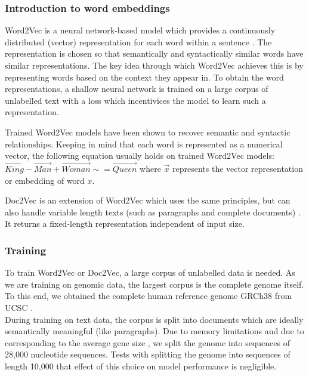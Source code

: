 \subsubsection{Introduction to word embeddings}
Word2Vec is a neural network-based model which provides a continuously distributed (vector) representation for each word within a sentence \cite{w2v1}\cite{w2v2}. The representation is chosen so that semantically and syntactically similar words have similar representations. The key idea through which Word2Vec achieves this is by representing words based on the context they appear in. To obtain the word representations, a shallow neural network is trained on a large corpus of unlabelled text with a loss which incentivices the model to learn such a representation.

Trained Word2Vec models have been shown to recover semantic and syntactic relationships. Keeping in mind that each word is represented as a numerical vector, the following equation usually holds on trained Word2Vec models: 
$\vec{King} - \vec{Man} + \vec{Woman} \sim = \vec{Queen}$ 
where $\vec{x}$ represents the vector representation or embedding of word $x$.




Doc2Vec is an extension of Word2Vec which uses the same principles, but can also handle variable length texts (such as paragraphs and complete documents) \cite{d2v1} \cite{d2v2}. It returns a fixed-length representation independent of input size.

\subsubsection{Training}
To train Word2Vec or Doc2Vec, a large corpus of unlabelled data is needed. As we are training on genomic data, the largest corpus is the complete genome itself. To this end, we obtained the complete human reference genome GRCh38 from UCSC \cite{ucsc}.\\ %
During training on text data, the corpus is split into documents which are ideally semantically meaningful (like paragraphs). Due to memory limitations and due to corresponding to the average gene size \cite{bionumbers}, we split the genome into sequences of 28,000 nucleotide sequences. Tests with splitting the genome into sequences of length 10,000 that effect of this choice on model performance is negligible. 
